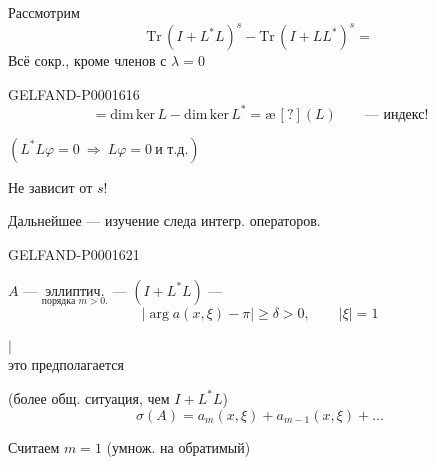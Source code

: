 Рассмотрим
\begin{equation*}
\mathrm{Tr}\,(I+L^*L)^s-\mathrm{Tr}\,(I+LL^*)^s=
\end{equation*}
Всё сокр., кроме членов с $\lambda=0$

\begin{GelfandAdjacentEvidence}{GELFAND-P000161}{6}
\begin{equation*}
=\mathrm{dim}\,\mathrm{ker}\,L-\mathrm{dim}\,\mathrm{ker}\,L^*=\text{\ae}\, [?](L)\qquad\text{— индекс!}
\end{equation*}
\end{GelfandAdjacentEvidence}


$(L^*L\varphi=0\ \Rightarrow\ L\varphi=0\ \text{и т.д.})$

Не зависит от $s$!


Дальнейшее — изучение следа интегр. операторов.



\begin{GelfandAdjacentEvidence}{GELFAND-P000162}{1}
\hfill{}


$A$ — $\underset{\text{порядка }m>0.}{\text{эллиптич.}}$ — $(I+L^*L)$ —
\begin{equation*}
|\arg a(x,\xi)-\pi|\geq\delta>0,\qquad |\xi|=1
\end{equation*}
\begin{center}
$\vert$\\[-.3ex]
это предполагается
\end{center}
(более общ. ситуация, чем $I+L^*L$)
\begin{equation*}
\sigma(A)=a_m(x,\xi)+a_{m-1}(x,\xi)+\ldots
\end{equation*}
\end{GelfandAdjacentEvidence}


Считаем $m=1$ (умнож. на обратимый)

